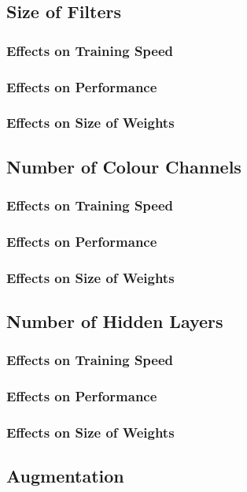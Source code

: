 \subsection{Size of Filters}
\subsubsection{Effects on Training Speed}
\subsubsection{Effects on Performance}
\subsubsection{Effects on Size of Weights}

\subsection{Number of Colour Channels}
\subsubsection{Effects on Training Speed}
\subsubsection{Effects on Performance}
\subsubsection{Effects on Size of Weights}

\subsection{Number of Hidden Layers}
\subsubsection{Effects on Training Speed}
\subsubsection{Effects on Performance}
\subsubsection{Effects on Size of Weights}

\subsection{Augmentation}
